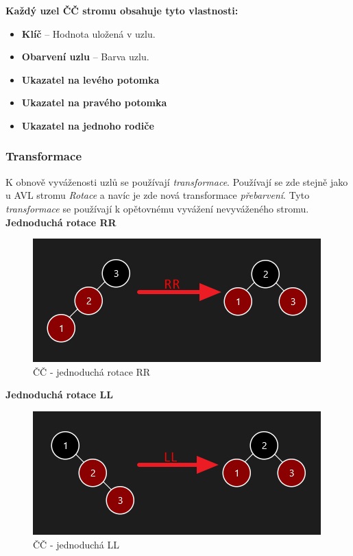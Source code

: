 \documentclass[
  biblatex=false,
  font=serif,
  glossaries=false,
  tables=false,
  theorems=false,
  index
]{kidiplom}
\begin{document}
\newpage
\noindent\textbf{Každý uzel ČČ stromu obsahuje tyto vlastnosti:}
\begin{itemize}
\item \textbf{Klíč} -- Hodnota uložená v uzlu.
\item \textbf{Obarvení uzlu} -- Barva uzlu.
\item \textbf{Ukazatel na levého potomka}
\item \textbf{Ukazatel na pravého potomka}
\item \textbf{Ukazatel na jednoho rodiče}
\end{itemize}

\subsubsection{Transformace}
\indent\indent K obnově vyváženosti uzlů se používají \textit{transformace}. Používají se zde stejně jako u AVL stromu \textit{Rotace} a navíc je zde nová transformace \textit{přebarvení}. Tyto \textit{transformace} se používají k opětovnému vyvážení nevyváženého stromu.\\

\noindent\textbf{Jednoduchá rotace RR}
\begin{figure}[h!]
\centering
	\includegraphics[scale=0.8]{obrazky/18RR.png}
	\caption{ČČ - jednoduchá rotace RR}
\end{figure}

\noindent\textbf{Jednoduchá rotace LL}
\begin{figure}[h!]
\centering
	\includegraphics[scale=0.8]{obrazky/19LL.png}
	\caption{ČČ - jednoduchá LL}
\end{figure}
\end{document}
